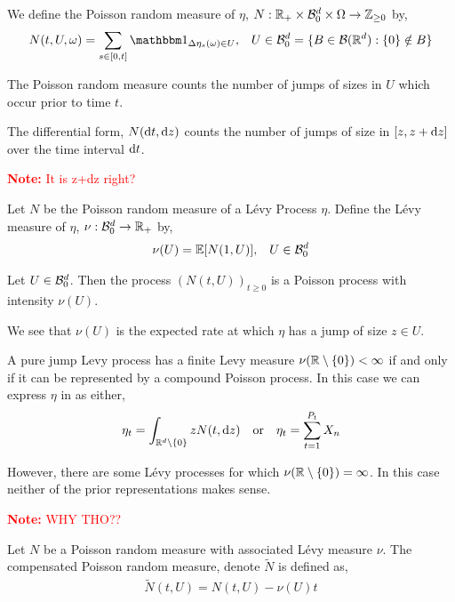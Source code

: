 \documentclass[12pt]{article}
\newcommand{\note}[1]{\textcolor{red}{\textbf{Note:} #1}}
\begin{document}
\begin{definition}
    We define the Poisson random measure of \( \eta \), \( N: \mathbb{R}_+ \times \mathcal{B}_0^d \times \Omega \to \mathbb{Z}_{\geq 0} \) by,
    \begin{align*}
        N(t,U,\omega) = \sum_{s\in[0,t]} \bOne_{\Delta\eta_s(\omega)\in U}, && U \in \cB_0^d = \{ B\in \cB(\RR^d) : \{0\} \notin B\}
    \end{align*}
\end{definition}

The Poisson random measure counts the number of jumps of sizes in \( U \) which occur prior to time \( t \).

The differential form, \( N(\mathrm{d} t, \mathrm{d} z) \) counts the number of jumps of size in \( [z,z+ \mathrm{d} z] \) over the time interval \( \mathrm{d} t \).

\note{It is z+dz right?}

\begin{definition}
Let \( N \) be the Poisson random measure of a L\'evy Process \( \eta \). Define the L\'evy measure of \( \eta \), \( \nu: \mathcal{B}_0^d \to \mathbb{R}_+ \) by,
\begin{align*}
    \nu(U) = \mathbb{E}[N(1,U)], && U\in \mathcal{B}_0^d
\end{align*}
\end{definition}

\begin{theorem}
    Let \( U\in\mathcal{B}_0^d \). Then the process \( (N(t,U))_{t\geq 0} \) is a Poisson process with intensity \( \nu(U) \).
\end{theorem}

We see that \( \nu(U) \) is the expected rate at which \( \eta \) has a jump of size \( z \in U \).

A pure jump L\;evy process has a finite Levy measure \( \nu(\mathbb{R}\setminus \{0\} ) < \infty \) if and only if it can be represented by a compound Poisson process. In this case we can express \( \eta \) in as either,
\begin{align*}
    \eta_t  = \int_{\mathbb{R}^d\setminus\{0\}} z N(t,\mathrm{d} z) && \text{or} && \eta_t = \sum_{t=1}^{P_t} X_n
\end{align*}

However, there are some L\'evy processes for which \( \nu(\mathbb{R}\setminus \{0\} ) = \infty \). In this case neither of the prior representations makes sense.

\note{WHY THO??}

\begin{definition}
    Let \( N \) be a Poisson random measure with associated L\'evy measure \( \nu \). The compensated Poisson random measure, denote \( \tilde{N} \) is defined as,
    \begin{align*}
        \tilde{N}(t,U) = N(t,U) - \nu(U) t
    \end{align*}
\end{definition}
\end{document}

